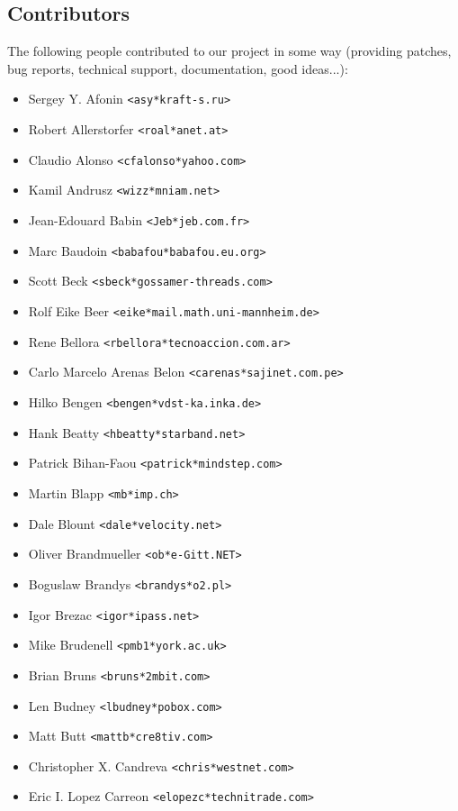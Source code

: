\documentclass[a4paper,titlepage,12pt]{article}
\newcommand{\email}[1]{\texttt{#1}}
\begin{document}
    \subsection{Contributors}
    The following people contributed to our project in some way (providing
    patches, bug reports, technical support, documentation, good ideas...):
    \begin{itemize}
	\item Sergey Y. Afonin \email{<asy*kraft-s.ru>}
	\item Robert Allerstorfer \email{<roal*anet.at>}
	\item Claudio Alonso \email{<cfalonso*yahoo.com>}
	\item Kamil Andrusz \email{<wizz*mniam.net>}
	\item Jean-Edouard Babin \email{<Jeb*jeb.com.fr>}
	\item Marc Baudoin \email{<babafou*babafou.eu.org>}
	\item Scott Beck \email{<sbeck*gossamer-threads.com>}
	\item Rolf Eike Beer \email{<eike*mail.math.uni-mannheim.de>}
	\item Rene Bellora \email{<rbellora*tecnoaccion.com.ar>}
	\item Carlo Marcelo Arenas Belon \email{<carenas*sajinet.com.pe>}
	\item Hilko Bengen \email{<bengen*vdst-ka.inka.de>}
	\item Hank Beatty \email{<hbeatty*starband.net>}
	\item Patrick Bihan-Faou \email{<patrick*mindstep.com>}
	\item Martin Blapp \email{<mb*imp.ch>}
	\item Dale Blount \email{<dale*velocity.net>}
	\item Oliver Brandmueller \email{<ob*e-Gitt.NET>}
	\item Boguslaw Brandys \email{<brandys*o2.pl>}
	\item Igor Brezac \email{<igor*ipass.net>}
	\item Mike Brudenell \email{<pmb1*york.ac.uk>}
	\item Brian Bruns \email{<bruns*2mbit.com>}
	\item Len Budney \email{<lbudney*pobox.com>}
	\item Matt Butt \email{<mattb*cre8tiv.com>}
	\item Christopher X. Candreva \email{<chris*westnet.com>}
	\item Eric I. Lopez Carreon \email{<elopezc*technitrade.com>}

\end{itemize}
\end{document}
